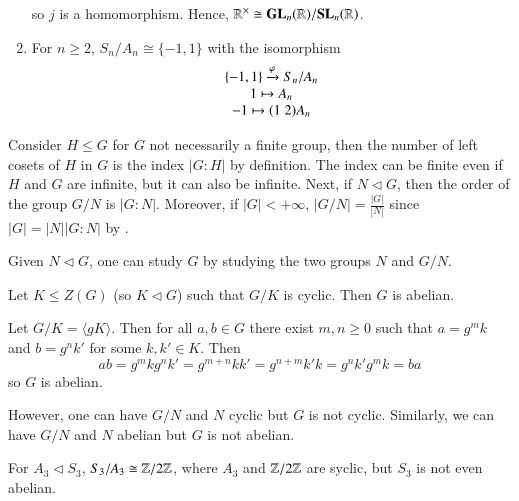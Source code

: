 \documentclass[12pt, a4paper, twoside, openright, titlepage]{book}
\begin{document}
\begin{eg}{}{}
\begin{enumerate}
\begin{proof*}{}{}
\begin{equation}
                                \end{equation}
                                so $j$ is a homomorphism. Hence, $\mathbb R^{\times} \cong \mathbf{GL}_n(\mathbb R)/\mathbf{SL}_n(\mathbb R)$.
                        \end{proof*}
                \item For $n \geq 2$, $S_n/A_n \cong \{-1,1\}$ with the isomorphism \begin{equation}
                                \begin{array}{c} \{-1,1\}\xrightarrow{\varphi} S_n/A_n \\ \begin{array}{c} 1\mapsto A_n \\ -1\mapsto (1\;2)A_n \end{array} \end{array}
                \end{equation}
        \end{enumerate}
\end{eg}

\begin{rmk}{}{}
        Consider $H\leq G$ for $G$ not necessarily a finite group, then the number of left cosets of $H$ in $G$ is the index $|G:H|$ by definition. The index can be finite even if $H$ and $G$ are infinite, but it can also be infinite. Next, if $N \vartriangleleft G$, then the order of the group $G/N$ is $|G:N|$. Moreover, if $|G| <+\infty$, $|G/N| = \frac{|G|}{|N|}$ since $|G| = |N||G:N|$ by .
\end{rmk}

\begin{rmk}{}{}
        Given $N \vartriangleleft G$, one can study $G$ by studying the two groups $N$ and $G/N$.
\end{rmk}

\begin{thm}{}{}
        Let $K \leq Z(G)$ (so $K \vartriangleleft G$) such that $G/K$ is cyclic. Then $G$ is abelian.
\end{thm}
\begin{proof*}{}{}
        Let $G/K = \langle gK \rangle$. Then for all $a,b \in G$ there exist $m,n \geq 0$ such that $a = g^mk$ and $b = g^nk'$ for some $k,k' \in K$. Then $$ab = g^mkg^nk' = g^{m+n}kk' = g^{n+m}k'k = g^nk'g^mk = ba$$ so $G$ is abelian.
\end{proof*}

\begin{rmk}{}{}
        However, one can have $G/N$ and $N$ cyclic but $G$ is not cyclic. Similarly, we can have $G/N$ and $N$ abelian but $G$ is not abelian.
\end{rmk}

\begin{eg}{}{}
        For $A_3 \vartriangleleft S_3$, $S_3/A_3 \cong \mathbb Z/2\mathbb Z$, where $A_3$ and $\mathbb Z/2\mathbb Z$ are syclic, but $S_3$ is not even abelian.
\end{eg}
\end{document}
